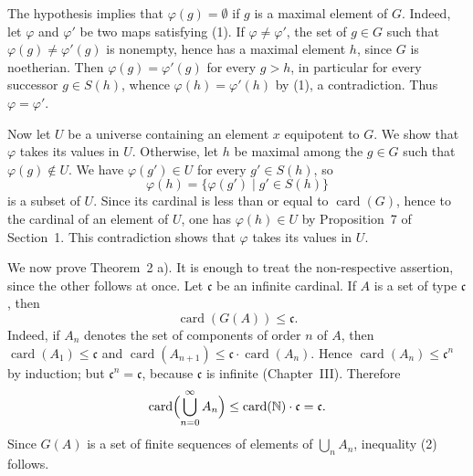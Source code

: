 \documentclass[11pt]{article}
\newcommand{\card}{\operatorname{card}}
\newcommand{\NN}{\mathbb{N}}
\begin{document}
The hypothesis implies that \(\varphi(g)=\emptyset\) if \(g\) is a maximal element of \(G\). Indeed, let \(\varphi\) and \(\varphi'\) be two maps satisfying (1). If \(\varphi\neq\varphi'\), the set of \(g\in G\) such that \(\varphi(g)\neq\varphi'(g)\) is nonempty, hence has a maximal element \(h\), since \(G\) is noetherian. Then \(\varphi(g)=\varphi'(g)\) for every \(g>h\), in particular for every successor \(g\in S(h)\), whence \(\varphi(h)=\varphi'(h)\) by (1), a contradiction. Thus \(\varphi=\varphi'\).

Now let \(U\) be a universe containing an element \(x\) equipotent to \(G\). We show that \(\varphi\) takes its values in \(U\). Otherwise, let \(h\) be maximal among the \(g\in G\) such that \(\varphi(g)\notin U\). We have \(\varphi(g')\in U\) for every \(g'\in S(h)\), so
\[
 \varphi(h)=\{\varphi(g')\mid g'\in S(h)\}
\]
is a subset of \(U\). Since its cardinal is less than or equal to \(\card(G)\), hence to the cardinal of an element of \(U\), one has \(\varphi(h)\in U\) by Proposition~7 of Section~1. This contradiction shows that \(\varphi\) takes its values in \(U\).

We now prove Theorem~2 a). It is enough to treat the non-respective assertion, since the other follows at once. Let \(\mathfrak c\) be an infinite cardinal. If \(A\) is a set of type \(\mathfrak c\), then
\begin{equation}
 \card(G(A))\leq\mathfrak c.
 \tag{2}
\end{equation}
Indeed, if \(A_n\) denotes the set of components of order \(n\) of \(A\), then \(\card(A_1)\leq\mathfrak c\) and \(\card(A_{n+1})\leq\mathfrak c\cdot\card(A_n)\). Hence \(\card(A_n)\leq\mathfrak c^n\) by induction; but \(\mathfrak c^n=\mathfrak c\), because \(\mathfrak c\) is infinite (Chapter~III). Therefore
\[
 \card\Bigl(\bigcup_{n=0}^{\infty}A_n\Bigr)\leq\card(\NN)\cdot\mathfrak c=\mathfrak c.
\]
Since \(G(A)\) is a set of finite sequences of elements of \(\bigcup_n A_n\), inequality (2) follows.
\end{document}
